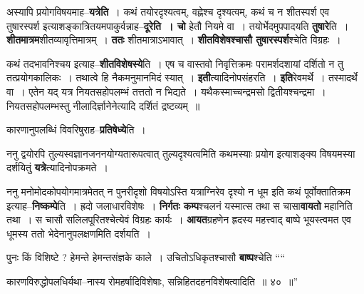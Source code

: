 \documentclass[article,12pt,a4paper]{memoir}
\begin{document}
	  \pstart अस्यापि प्रयोगविषयमाह--\textbf{यत्रेति} । कथं तयोरदृश्यत्वम्, वह्नेश्च दृश्यत्वम्, कथं च न शीतस्पर्श एव तुषारस्पर्श इत्याशङ्कात्रितयमपाकुर्वन्नाह--\textbf{दूरेति । चो} हेतौ नियमे वा । तयोर्भेदमुपपादयति \textbf{तुषारे}ति । \textbf{शीतमात्रम}शीतव्यावृत्तिमात्रम् । \textbf{ततः} शीतमात्राऽभावात् । \textbf{शीतविशेषश्चासौ तुषारस्पर्श}श्चेति विग्रहः ।
	\pend
      

	  \pstart कथं तदभावनिश्चय इत्याह--\textbf{शीतविशेषस्ये}ति । एष च वास्तवो निवृत्तिक्रमः परामर्शदशायां दर्शितो न तु तत्प्रयोग\leavevmode{}कालिकः । तथात्वे हि नैकमनुमानमिदं स्यात् । \textbf{इती}त्यादिनोपसंहरति । \textbf{इति}रेवमर्थे । तस्मादर्थे वा । एतेन यद् यत्र नियतसहोपलम्भं तत्ततो न भिद्यते । यथैकस्माच्चन्द्रमसो द्वितीयश्चन्द्रमा । नियतसहोपलम्भस्तु नीलादिर्ज्ञानेनेत्यादि दर्शितं द्रष्टव्यम् ॥
	\pend
      

	  \pstart कारणानुपलब्धिं विवरिषुराह--\textbf{प्रतिषेध्ये}ति ।
	\pend
      

	  \pstart ननु द्वयोरपि तुल्यस्वज्ञानजननयोग्यतारूपत्वात् तुल्यदृश्यत्वमिति कथमस्याः प्रयोग इत्याशङ्क्य विषयमस्या दर्शयितुं \textbf{यत्रे}त्यादिनोपक्रमते ।
	\pend
      

	  \pstart ननु मनोमोदकोपयोगमात्रमेतत् न पुनरीदृशो विषयोऽस्ति यत्राग्निरेव दृश्यो न धूम इति कथं पूर्वोक्तातिक्रम इत्याह--\textbf{निष्कम्पे}ति । ह्रदो जलाधारविशेषः । \textbf{निर्गतः कम्प}श्चलनं यस्मात्स तथा स चासा\textbf{वायतो} महानिति तथा । स चासौ सलिलपूरितश्चेत्येवं विग्रहः कार्यः । \textbf{आयत}ग्रहणेन ह्रदस्य महत्त्वाद् बाष्पे भूयस्त्वमत एव धूमस्य ततो भेदेनानुपलक्षणमिति दर्शयति ।
	\pend
      

	  \pstart पुनः किं विशिष्टे ? हेमन्ते हेमन्तसंज्ञके काले । उचितोऽधिकृतश्चासौ \textbf{बाष्प}श्चेति  \leavevmode{} ““
	  
	कारणविरुद्धोपलधिर्यथा--नास्य रोमहर्षादिविशेषाः, सन्निहितदहनविशेषत्वादिति ॥ ४० ॥” 
	  
\end{document}
